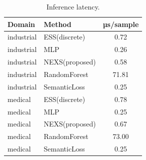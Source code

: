 \begin{table}[t]\centering
\caption{Inference latency.}
\label{tab:lat}
\begin{tabular}{llc}
\toprule
Domain & Method & µs/sample \\
\midrule
industrial & ESS(discrete) & 0.72 \\
industrial & MLP & 0.26 \\
industrial & NEXS(proposed) & 0.58 \\
industrial & RandomForest & 71.81 \\
industrial & SemanticLoss & 0.25 \\
medical & ESS(discrete) & 0.78 \\
medical & MLP & 0.25 \\
medical & NEXS(proposed) & 0.67 \\
medical & RandomForest & 73.00 \\
medical & SemanticLoss & 0.25 \\
\bottomrule
\end{tabular}
\end{table}
